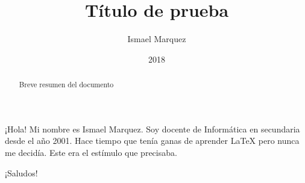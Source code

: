 \documentclass[a4paper,11pt]{article}
\title{\textbf{Título de prueba}}
\author{Ismael Marquez}
\date{2018}
\begin{document}
\maketitle
\thispagestyle{fancy}
\begin{abstract}
Breve resumen del documento
\end{abstract}

¡Hola! Mi nombre es Ismael Marquez. Soy docente de Informática en secundaria desde el año 2001. Hace tiempo que tenía ganas de aprender {\LaTeX} pero nunca me decidía. Este era el estímulo que precisaba.


¡Saludos!
\end{document}
